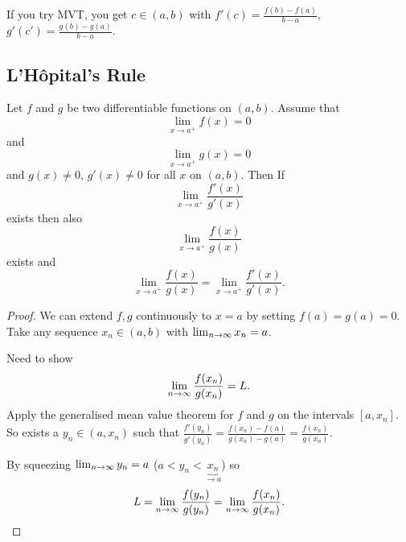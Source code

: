 \documentclass[10pt, a4paper]{article}
\begin{document}
If you try MVT,
you get $c \in (a, b)$ with $f'(c) = \frac{f(b) - f(a)}{b - a}$,
$g'(c') = \frac{g(b) - g(a)}{b - a}$.

\subsection{L'H\^opital's Rule}

\begin{theorem}
    Let $f$ and $g$ be two differentiable functions on $(a, b)$.
    Assume that
    \[
    \lim_{x \to a ^ {+}}f(x) = 0
    \]
    and
    \[
    \lim_{x \to a ^ {+}}g(x) = 0
    \]
    and $g(x) \neq 0$,
    $g'(x) \neq 0$ for all $x$ on $(a, b)$.
    Then
    If
    \[
    \lim_{x \to a ^ {+}}\frac{f'(x)}{g'(x)}
    \]
    exists then also
    \[
    \lim_{x \to a ^ {+}}\frac{f(x)}{g(x)}
    \]
    exists
    and
    \[
    \lim_{x \to a ^ {+}}\frac{f(x)}{g(x)} = \lim_{x \to a ^ {+}}\frac{f'(x)}{g'(x)}.
    \]
    
    \begin{proof}
        We can extend $f, g$ continuously to $x = a$ by setting $f(a) = g(a) = 0$.
        Take any  sequence $x_n \in (a, b)$ with $\lim_{n \rightarrow \infty} x_n = a$.

        Need to show
        \[
        \lim_{n \rightarrow \infty} \frac{f(x_n)}{g(x_n)} = L.
        \]
        Apply the generalised mean value theorem for $f$ and $g$ on the intervals $[a, x_n]$.
        So exists a $y_n \in (a, x_n)$ such that $\frac{f'(y_n)}{g'(y_n)} = \frac{f(x_n) - f(a)}{g(x_n) - g(a)} = \frac{f(x_n)}{g(x_n)}$.

        By squeezing $\lim_{n \rightarrow \infty} y_n = a$
        ($a < y_n < \underbrace{x_n}_{\to a}$)
        so
        \[
        L = \lim_{n \rightarrow \infty}\frac{f(y_n)}{g(y_n)} = \lim_{n \rightarrow \infty}\frac{f(x_n)}{g(x_n)}.
        \]
    \end{proof}
\end{theorem}
\end{document}
